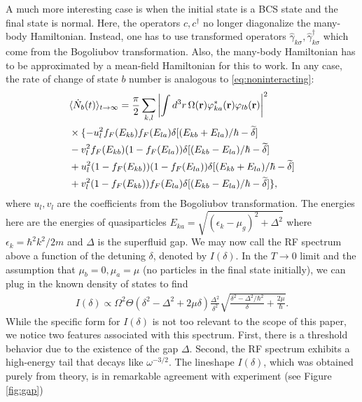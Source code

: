 \documentclass[prl,
twocolumn,
nofootinbib,
amsmath,amssymb,
aps]{revtex4-1}
\newcommand{\f}[2]{\frac{#1}{#2}}
\begin{document}
A much more interesting case is when the initial state is a BCS state and the final state is normal. Here, the operators $c,c^\dagger$ no longer diagonalize the many-body Hamiltonian. Instead, one has to use transformed operators $\hat{\gamma}_{k\sigma}, \hat{\gamma}^\dagger_{k\sigma}$ which come from the Bogoliubov transformation. Also, the many-body Hamiltonian has to be approximated by a mean-field Hamiltonian for this to work. In any case, the rate of change of state $b$ number is analogous to \eqref{eq:noninteracting}:
\begin{align*}
&\langle \dot N_b(t) \rangle_{t\to \infty} 
= \f{\pi}{2} \sum_{k,l} \abs{ \int d^3 r\,  \Omega(\mathbf{r}) \varphi_{ka}^*(\mathbf{r}) \varphi_{lb} (\mathbf{r})}^2   \nonumber \\
& \times \{   -u_l^2 f_F(E_{kb}) f_F(E_{la}) \delta[(E_{kb} + E_{la})/\hbar - \widetilde{\delta}]\nonumber \\
& -v_l^2 f_F(E_{kb}) (1 - f_F(E_{la})) \delta[(E_{kb} - E_{la})/\hbar - \widetilde{\delta}] \nonumber \\
& +u_l^2 (1 - f_F(E_{kb})) (1 - f_F(E_{la})) \delta[(E_{kb} + E_{la})/\hbar - \widetilde{\delta}]\nonumber \\
& + v_l^2  (1 - f_F(E_{kb})) f_F(E_{la})  \delta[(E_{kb} - E_{la})/\hbar - \widetilde{\delta}] 
\},
\end{align*}
where $u_l, v_l$ are the coefficients from the Bogoliubov transformation.  The energies here are the energies of quasiparticles $E_{ka} = \sqrt{(\epsilon_k - \mu_g)^2 + \Delta^2  }$ where $\epsilon_k = \hbar^2 k^2 / 2m$ and $\Delta$ is the superfluid gap.  We may now call the RF spectrum above a function of the detuning $\delta$, denoted by $I(\delta)$. In the $T\to 0$ limit and the assumption that $\mu_b = 0, \mu_a = \mu$ (no particles in the final state initially), we can plug in the known density of states to find 
\begin{align*}
I(\delta) \propto \Omega^2 \Theta(\delta^2 -\Delta^2 + 2\mu \delta) \f{\Delta^2}{\delta^2} \sqrt{\f{\delta^2 - \Delta^2/\hbar^2}{\delta} + \f{2\mu}{\hbar}}.
\end{align*}
While the specific form for $I(\delta)$ is not too relevant to the scope of this paper, we notice two features associated with this spectrum. First, there is a threshold behavior due to the existence of the gap $\Delta$. Second, the RF spectrum exhibits a high-energy tail that decays like $\omega^{-3/2}$. The lineshape $I(\delta)$, which was obtained purely from theory, is in remarkable agreement with experiment (see Figure \ref{fig:gap})
\end{document}
